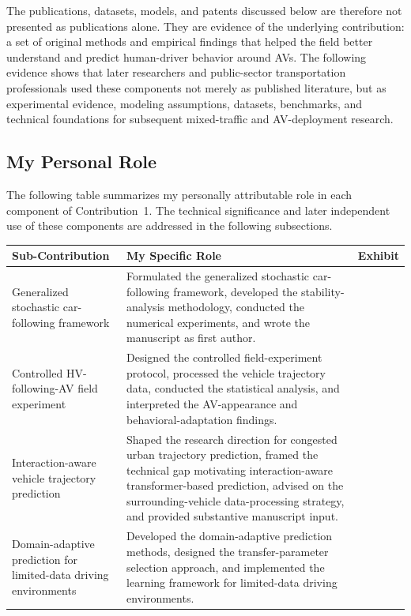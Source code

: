 \documentclass[11pt,letterpaper]{article}
\renewcommand{\arraystretch}{1.18}
\begin{document}
The publications, datasets, models, and patents discussed below are therefore not presented as publications alone. They are evidence of the underlying contribution: a set of original methods and empirical findings that helped the field better understand and predict human-driver behavior around AVs. The following evidence shows that later researchers and public-sector transportation professionals used these components not merely as published literature, but as experimental evidence, modeling assumptions, datasets, benchmarks, and technical foundations for subsequent mixed-traffic and AV-deployment research.

\subsection{My Personal Role}

The following table summarizes my personally attributable role in each component of Contribution~1. The technical significance and later independent use of these components are addressed in the following subsections.

\begin{singlespace}
\small
\renewcommand{\arraystretch}{1.08}
\begin{tabularx}{\textwidth}{@{}p{}p{}Y@{}}
\toprule
\textbf{Sub-Contribution} & \textbf{My Specific Role} & \textbf{Exhibit} \\
\midrule

Generalized stochastic car-following framework &
Formulated the generalized stochastic car-following framework, developed the stability-analysis methodology, conducted the numerical experiments, and wrote the manuscript as first author. &
 \\

Controlled HV-following-AV field experiment &
Designed the controlled field-experiment protocol, processed the vehicle trajectory data, conducted the statistical analysis, and interpreted the AV-appearance and behavioral-adaptation findings. &
 \\

Interaction-aware vehicle trajectory prediction &
Shaped the research direction for congested urban trajectory prediction, framed the technical gap motivating interaction-aware transformer-based prediction, advised on the surrounding-vehicle data-processing strategy, and provided substantive manuscript input. &
 \\

Domain-adaptive prediction for limited-data driving environments &
Developed the domain-adaptive prediction methods, designed the transfer-parameter selection approach, and implemented the learning framework for limited-data driving environments. &
 \\

\bottomrule
\end{tabularx}
\end{singlespace}
\end{document}
